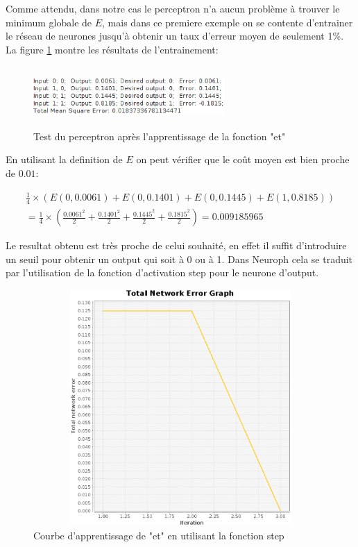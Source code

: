 \documentclass[twoside,openright,a4paper,11pt,french]{article}
\begin{document}
Comme attendu, dans notre cas le perceptron n'a aucun problème à trouver le
minimum globale de $E$, mais dans ce premiere exemple on se contente d'entrainer le
réseau de neurones jusqu'à obtenir un taux d'erreur moyen de seulement 1\%. La
figure \ref{fig:andtest1} montre les résultats de l'entrainement:

\begin{figure}[h]
\centering
\includegraphics[width=7.3cm,height=2.3cm]{./pics/andtest1.eps}
\caption{Test du perceptron après l'apprentissage de la fonction "et"}
\label{fig:andtest1}
\end{figure}

En utilisant la definition de $E$ on peut vérifier que le coût
moyen est bien proche de $0.01$:

\begin{equation*}
  \begin{aligned}
  \tfrac{1}{4}\times(E(0,0.0061)+E(0,0.1401)+E(0,0.1445)+E(1,0.8185))\\
  = \tfrac{1}{4}\times(\tfrac{0.0061^2}{2}+\tfrac{0.1401^2}{2}+\tfrac{0.1445^2}{2}+\tfrac{0.1815^2}{2}) =
  0.009185965
  \end{aligned}
\end{equation*}

Le resultat obtenu est très proche de celui souhaité, en effet il suffit 
d'introduire un seuil pour obtenir un output qui soit à 0 ou à 1.
Dans Neuroph cela se traduit par l'utilisation de la fonction d'activation step pour le
neurone d'output.


\begin{figure}[h]
\centering
\includegraphics[width=12cm,height=9cm]{./pics/and_error2.eps}
\caption{Courbe d'apprentissage de "et" en utilisant la fonction step}
\label{fig:anderr}
\end{figure}
\end{document}
